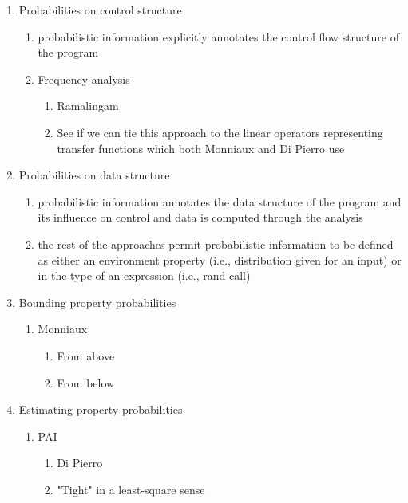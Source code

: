 \begin{enumerate}

 \item Probabilities on control structure
   \begin{enumerate}
    \item probabilistic information explicitly annotates the control flow
    structure of the program
    \item Frequency analysis
      \begin{enumerate}
       \item Ramalingam
       \item See if we can tie this approach to the linear
  	  operators representing transfer functions
  	  which both Monniaux and Di Pierro use
      \end{enumerate}
   \end{enumerate}

 \item Probabilities on data structure
   \begin{enumerate}
    \item probabilistic information annotates the data structure of the
    program and its influence on control and data is computed through
    the analysis
    \item the rest of the approaches permit probabilistic information to
    be defined as either an environment property (i.e., distribution
    given for an input) or in the type of an expression (i.e., rand call)
   \end{enumerate}

 \item Bounding property probabilities
   \begin{enumerate}
    \item Monniaux
      \begin{enumerate}
       \item From above
       \item From below
      \end{enumerate}
   \end{enumerate}

 \item Estimating property probabilities
   \begin{enumerate}
    \item PAI
     \begin{enumerate}
      \item Di Pierro
      \item "Tight" in a least-square sense
     \end{enumerate}
   \end{enumerate}


\end{enumerate}
